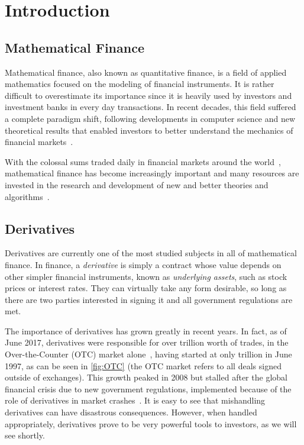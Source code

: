\chapter{Introduction}
\label{chapter:introduction}
\section{Mathematical Finance}
\label{section:mathematical finance}
Mathematical finance, also known as quantitative finance, is a field of applied mathematics focused on the modeling of financial instruments.
It is rather difficult to overestimate its importance since it is heavily used by investors and investment banks in every day transactions.
In recent decades, this field suffered a complete paradigm shift, following developments in computer science and new theoretical results that enabled investors to better understand the mechanics of financial markets~\citep{compfinance}.

With the colossal sums traded daily in financial markets around the world~\citep{WFE}, mathematical finance has become increasingly important and many resources are invested in the research and development of new and better theories and algorithms~\citep{quants}.


\section{Derivatives}
\label{section:derivatives}
Derivatives are currently one of the most studied subjects in all of mathematical finance.
In finance, a \emph{derivative} is simply a contract whose value depends on other simpler financial instruments, known as \emph{underlying assets}, such as stock prices or interest rates.
They can virtually take any form desirable, so long as there are two parties interested in signing it and all government regulations are met.


The importance of derivatives has grown greatly in recent years. In fact, as of June 2017, derivatives were responsible for over  trillion worth of trades, in the Over-the-Counter (OTC) market alone~\citep{BIS}, having started at only  trillion in June 1997, as can be seen in \autoref{fig:OTC} (the OTC market refers to all deals signed outside of exchanges).
This growth peaked in 2008 but stalled after the global financial crisis due to new government regulations, implemented because of the role of derivatives in market crashes~\citep{FT}. It is easy to see that mishandling derivatives can have disastrous consequences. However, when handled appropriately, derivatives prove to be very powerful tools to investors, as we will see shortly.


